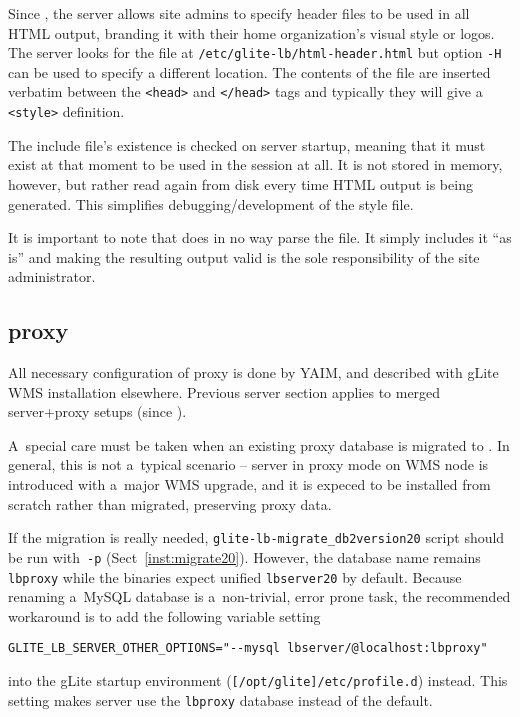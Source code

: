 Since , the server allows site admins to specify header files to be used in all HTML output, branding it with their home organization's visual style or logos. The server looks for the file at \texttt{/etc/glite-lb/html-header.html} but option \texttt{-H} can be used to specify a different location. The contents of the file are inserted verbatim between the \texttt{<head>} and \texttt{</head>} tags and typically they will give a \texttt{<style>} definition. 

The include file's existence is checked on server startup, meaning that it must exist at that moment to be used in the session at all. It is not stored in memory, however, but rather read again from disk every time HTML output is being generated. This simplifies debugging/development of the style file.

It is important to note that \LB does in no way parse the file. It simply includes it ``as is'' and making the resulting output valid is the sole responsibility of the site administrator.

\subsection{\LB proxy}
\label{inst:LBproxy}


All necessary configuration of \LB proxy is done by YAIM,
and described with gLite WMS installation elsewhere.
Previous \LB server section applies to merged server+proxy setups (since ).

A~special care must be taken when an existing \LB proxy database
is migrated to .
In general, this is not a~typical scenario --  server in proxy mode
on WMS node is introduced with a~major WMS upgrade, and it is expeced
to be installed from scratch rather than migrated, preserving \LB proxy data.

If the migration is really needed, \verb'glite-lb-migrate_db2version20'
script should be run with~\verb'-p' (Sect~\ref{inst:migrate20}).
However, the \LB database name remains \verb'lbproxy' while
the  binaries expect unified \verb'lbserver20' by default.
Because renaming a~MySQL database is a~non-trivial, error prone task,
the recommended workaround is to add the following variable setting

\verb'GLITE_LB_SERVER_OTHER_OPTIONS="--mysql lbserver/@localhost:lbproxy"' 

into the gLite startup environment (\verb'[/opt/glite]/etc/profile.d') instead.
This setting makes \LB server use the \verb'lbproxy' database instead of the default.

